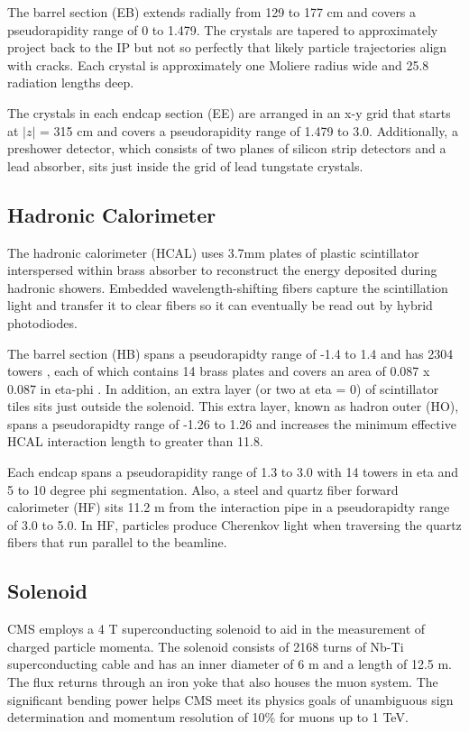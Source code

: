 \documentclass[12pt]{article}
\begin{document}
    The barrel section (EB) extends radially from 129 to 177  cm and covers a pseudorapidity range of 0 to 1.479. The crystals are tapered to approximately project back to the IP but not so perfectly that likely particle trajectories align with cracks. Each crystal is approximately one Moliere radius wide and 25.8 radiation lengths deep.

    The crystals in each endcap section (EE) are arranged in an x-y grid that starts at $|z|$ = 315 cm and covers a pseudorapidity range of 1.479 to 3.0. Additionally, a preshower detector, which consists of two planes of silicon strip detectors and a lead absorber, sits just inside the grid of lead tungstate crystals. 

\subsection{Hadronic Calorimeter}
    The hadronic calorimeter (HCAL) uses 3.7mm plates of plastic scintillator interspersed within brass absorber to reconstruct the energy deposited during hadronic showers. Embedded wavelength-shifting fibers capture the scintillation light and transfer it to clear fibers so it can eventually be read out by hybrid photodiodes.

    The barrel section (HB) spans a pseudorapidty range of -1.4 to 1.4 and has 2304 towers , each of which contains 14  brass plates and covers an area of 0.087 x 0.087 in eta-phi . In addition, an extra layer (or two at eta = 0) of scintillator tiles sits just outside the solenoid. This extra layer, known as hadron outer (HO), spans a pseudorapidty range of -1.26 to 1.26 and increases the minimum effective HCAL interaction length to greater than 11.8.

    Each endcap spans a pseudorapidity range of 1.3 to 3.0 with 14 towers in eta and 5 to 10 degree phi segmentation. Also, a steel and quartz fiber forward calorimeter (HF) sits 11.2 m from the interaction pipe in a pseudorapidty range of 3.0 to 5.0. In HF, particles produce Cherenkov light when traversing the quartz fibers that run parallel to the beamline. 

\subsection{Solenoid}
    CMS employs a 4 T superconducting solenoid to aid in the measurement of charged particle momenta. The solenoid consists of 2168 turns of Nb-Ti superconducting cable and has an inner diameter of 6 m and a length of 12.5 m. The flux returns through an iron yoke that also houses the muon system. The significant  bending power helps CMS meet its physics goals of unambiguous sign determination and momentum resolution of 10\% for muons up to 1 TeV.
\end{document}

